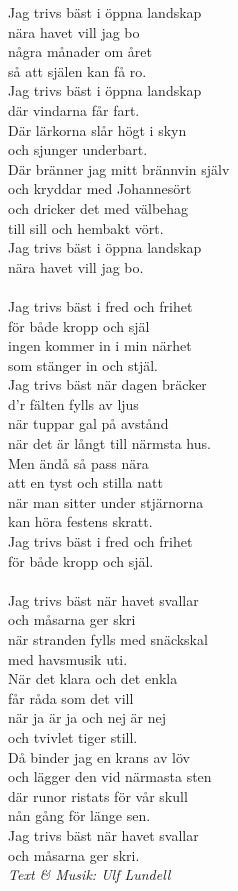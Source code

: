 \vspace{10pt}
Jag trivs bäst i öppna landskap\\
nära havet vill jag bo\\
några månader om året\\
så att själen kan få ro.\\
Jag trivs bäst i öppna landskap\\
där vindarna får fart.\\
Där lärkorna slår högt i skyn\\
och sjunger underbart.\\
Där bränner jag mitt brännvin själv\\
och kryddar med Johannesört\\
och dricker det med välbehag\\
till sill och hembakt vört.\\
Jag trivs bäst i öppna landskap\\
nära havet vill jag bo.\\
\\
Jag trivs bäst i fred och frihet\\
för både kropp och själ\\
ingen kommer in i min närhet\\
som stänger in och stjäl.\\
Jag trivs bäst när dagen bräcker\\
d'r fälten fylls av ljus\\
när tuppar gal på avstånd\\
när det är långt till närmsta hus.\\
Men ändå så pass nära\\
att en tyst och stilla natt\\
när man sitter under stjärnorna\\
kan höra festens skratt.\\
Jag trivs bäst i fred och frihet\\
för både kropp och själ.\\
\\
Jag trivs bäst när havet svallar\\
och måsarna ger skri\\
när stranden fylls med snäckskal\\
med havsmusik uti.\\
När det klara och det enkla\\
får råda som det vill\\
när ja är ja och nej är nej\\
och tvivlet tiger still.\\
Då binder jag en krans av löv\\
och lägger den vid närmasta sten\\
där runor ristats för vår skull\\
nån gång för länge sen.\\
Jag trivs bäst när havet svallar\\
och måsarna ger skri.\\
\vspace{10pt}
{\footnotesize\textit{Text \& Musik: Ulf Lundell}}
